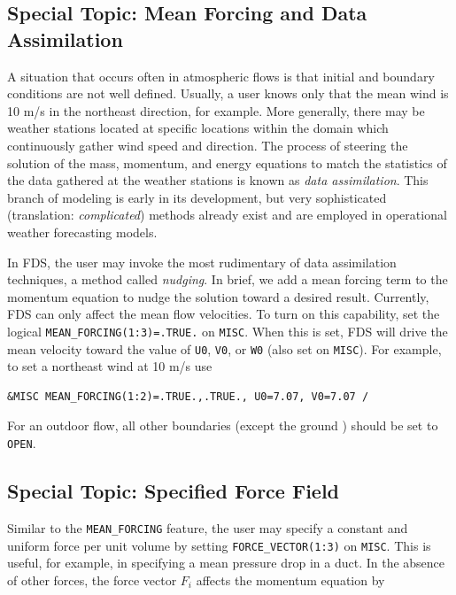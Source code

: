 \documentclass[11pt]{book}
\newcommand{\ct}{\tt\small}
\begin{document}
\subsection{Special Topic: Mean Forcing and Data Assimilation}
\label{info:mean_forcing}

A situation that occurs often in atmospheric flows is that initial and boundary conditions are not well defined.  Usually, a user knows only that the mean wind is 10 m/s in the northeast direction, for example.  More generally, there may be weather stations located at specific locations within the domain which continuously gather wind speed and direction.  The process of steering the solution of the mass, momentum, and energy equations to match the statistics of the data gathered at the weather stations is known as \emph{data assimilation}.  This branch of modeling is early in its development, but very sophisticated (translation: \emph{complicated}) methods already exist \cite{Kalnay:2003} and are employed in operational weather forecasting models.

In FDS, the user may invoke the most rudimentary of data assimilation techniques, a method called \emph{nudging}.  In brief, we add a mean forcing term to the momentum equation to nudge the solution toward a desired result.  Currently, FDS can only affect the mean flow velocities.  To turn on this capability, set the logical {\ct MEAN\_FORCING(1:3)=.TRUE.} on {\ct MISC}.  When this is set, FDS will drive the mean velocity toward the value of {\ct U0}, {\ct V0}, or {\ct W0} (also set on {\ct MISC}).  For example, to set a northeast wind at 10 m/s use

\footnotesize
\begin{verbatim}
&MISC MEAN_FORCING(1:2)=.TRUE.,.TRUE., U0=7.07, V0=7.07 /
\end{verbatim}
\normalsize

\noindent For an outdoor flow, all other boundaries (except the ground ) should be set to {\ct OPEN}.

\subsection{Special Topic: Specified Force Field}
\label{info:force_vector}

Similar to the {\ct MEAN\_FORCING} feature, the user may specify a constant and uniform force per unit volume by setting {\ct FORCE\_VECTOR(1:3)} on {\ct MISC}.  This is useful, for example, in specifying a mean pressure drop in a duct.  In the absence of other forces, the force vector $F_i$ affects the momentum equation by
\end{document}
